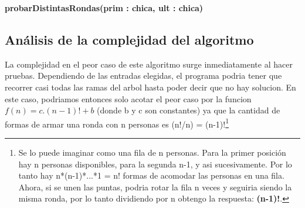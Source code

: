 \incmargin{1em}
\linesnumbered
{}

\textbf{probarDistintasRondas(prim : chica, ult : chica)}\\
	\begin{algorithm}[H]
		\BlankLine


  \end{algorithm}



\subsection{Análisis de la complejidad del algoritmo}
\label{complejidadej2}
La complejidad en el peor caso de este algoritmo surge inmediatamente al hacer pruebas. Dependiendo de las entradas elegidas, el programa podria tener que 
recorrer casi todas las ramas del arbol hasta poder decir que no hay solucion. En este caso, podriamos entonces solo acotar el peor caso por la funcion $f(n) = c.(n-1)! + b$ 
(donde b y c son constantes) ya que la cantidad de formas de armar una ronda con n personas es (n!/n) = (n-1)!\footnote{Se lo puede imaginar como una fila de n personas. Para la primer posición hay n personas disponibles, para la segunda n-1, y asi sucesivamente. Por lo tanto hay n*(n-1)*...*1 = n! formas de acomodar las personas en una fila. Ahora, si se unen las puntas, podria rotar la fila n veces y seguiria siendo la misma ronda, por lo tanto dividiendo por n obtengo la respuesta: \textbf{(n-1)!}.} 

